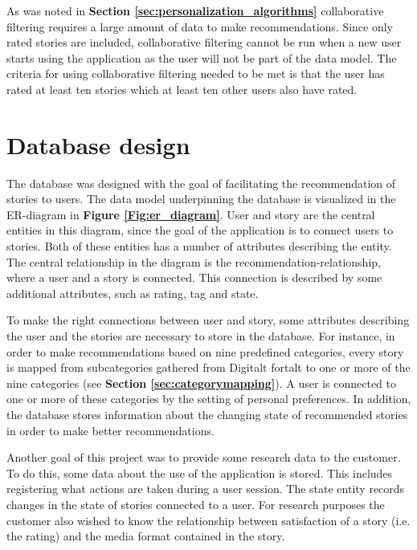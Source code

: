 As was noted in \textbf{Section \ref{sec:personalization_algorithms}} collaborative filtering requires a large amount of data to make recommendations. Since only rated stories are included, collaborative filtering cannot be run when a new user starts using the application as the user will not be part of the data model. The criteria for using collaborative filtering needed to be met is that the user has rated at least ten stories which at least ten other users also have rated. 

\section{Database design}
\label{sec:database_design}

The database was designed with the goal of facilitating the recommendation of stories to users. The data model underpinning the database is visualized in the ER-diagram in \textbf{Figure \ref{Fig:er_diagram}}. User and story are the central entities in this diagram, since the goal of the application is to connect users to stories. Both of these entities has a number of attributes describing the entity. The central relationship in the diagram is the recommendation-relationship, where a user and a story is connected. This connection is described by some additional attributes, such as rating, tag and state. \newline

To make the right connections between user and story, some attributes describing the user and the stories are necessary to store in the database. For instance, in order to make recommendations based on nine predefined categories, every story is mapped from subcategories gathered from Digitalt fortalt to one or more of the nine categories (see \textbf{Section \ref{sec:categorymapping}}). A user is connected to one or more of these categories by the setting of personal preferences. In addition, the database stores information about the changing state of recommended stories in order to make better recommendations. \newline

Another goal of this project was to provide some research data to the customer. To do this, some data about the use of the application is stored. This includes registering what actions are taken during a user session. The state entity records changes in the state of stories connected to a user. For research purposes the customer also wished to know the relationship between satisfaction of a story (i.e. the rating) and the media format contained in the story.

